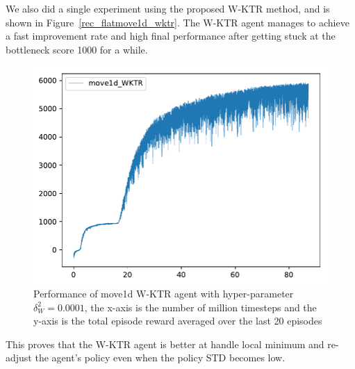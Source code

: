 We also did a single experiment using the proposed W-KTR method, and is shown in Figure~\ref{rec_flatmove1d_wktr}. The W-KTR agent manages to achieve a fast improvement rate and high final performance after getting stuck at the bottleneck score 1000 for a while.
\begin{figure}[h]
\includegraphics[width=\textwidth]{images/rec_flatmove1d_wktr.pdf}
\centering
\caption{Performance of move1d W-KTR agent with  hyper-parameter $\delta_W^2= 0.0001$, the x-axis is the number of million timesteps and the y-axis is the total episode reward averaged over the last 20 episodes}
\end{figure}\label{rec_flatmove1d_wktr}

This proves that the W-KTR agent is better at handle local minimum and re-adjust the agent's policy even when the policy STD becomes low.


